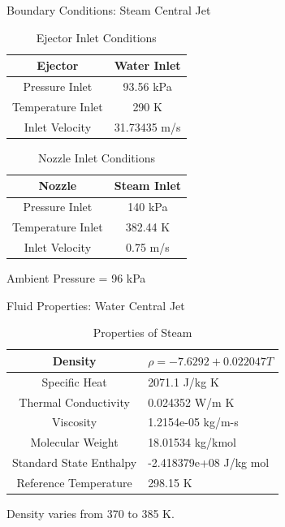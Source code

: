 \begin{frame}{Boundary Conditions: Steam Central Jet}
\begin{table}[h]
    \centering
    \caption{Ejector Inlet Conditions}
    \label{tab:ejectorbc}
    \begin{tabular}{|c|c|}
    \hline
        Ejector & Water Inlet \\
    \hline
        Pressure Inlet & 93.56 kPa \\
    \hline
        Temperature Inlet & 290 K \\
    \hline
        Inlet Velocity & 31.73435 m/s \\
    \hline
    \end{tabular}
\end{table}
\begin{table}[h]
    \centering
    \caption{Nozzle Inlet Conditions}
    \label{tab:nozzlebc}
    \begin{tabular}{|c|c|}
    \hline
        Nozzle & Steam Inlet \\
    \hline
        Pressure Inlet & 140 kPa \\
    \hline
        Temperature Inlet & 382.44 K \\
    \hline
        Inlet Velocity & 0.75 m/s \\
    \hline
    \end{tabular}
\end{table}
\centering Ambient Pressure = 96 kPa
\end{frame}

\begin{frame}{Fluid Properties: Water Central Jet}
    \begin{table}[h]
        \centering
        \caption{Properties of Steam}
        \label{tab:steampropwcj}
        \begin{tabular}{|c|p{3cm}|}
        \hline
            Density  & $\rho = -7.6292 + 0.022047 T $\\
        \hline
            Specific Heat &  2071.1 J/kg K \\
        \hline
            Thermal Conductivity & 0.024352 W/m K \\
        \hline
            Viscosity & 1.2154e-05 kg/m-s \\
        \hline
            Molecular Weight & 18.01534 kg/kmol \\
        \hline
            Standard State Enthalpy & -2.418379e+08 J/kg mol \\
        \hline
            Reference Temperature & 298.15 K \\
        \hline
        \end{tabular}
    \end{table}
    Density varies from 370 to 385 K.
\end{frame}


